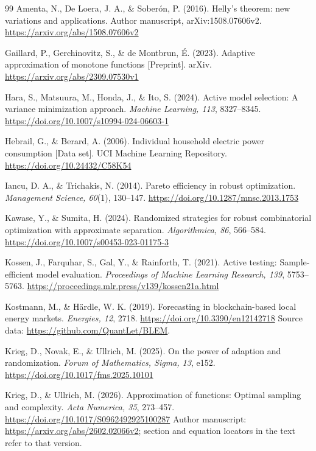 \documentclass[12pt]{article}
\begin{document}
\FloatBarrier
\begin{thebibliography}{99}
Amenta, N., De Loera, J. A., \& Sober\'on, P. (2016). Helly's theorem: new variations
and applications. Author manuscript, arXiv:1508.07606v2.
\url{https://arxiv.org/abs/1508.07606v2}

Gaillard, P., Gerchinovitz, S., \& de Montbrun, {\'E}. (2023).
Adaptive approximation of monotone functions [Preprint].
arXiv. \url{https://arxiv.org/abs/2309.07530v1}

Hara, S., Matsuura, M., Honda, J., \& Ito, S. (2024).
Active model selection: A variance minimization approach.
\emph{Machine Learning, 113}, 8327--8345.
\url{https://doi.org/10.1007/s10994-024-06603-1}

Hebrail, G., \& Berard, A. (2006). Individual household electric power
consumption [Data set]. UCI Machine Learning Repository.
\url{https://doi.org/10.24432/C58K54}

Iancu, D. A., \& Trichakis, N. (2014). Pareto efficiency in robust optimization.
\emph{Management Science, 60}(1), 130--147.
\url{https://doi.org/10.1287/mnsc.2013.1753}

Kawase, Y., \& Sumita, H. (2024). Randomized strategies for robust
combinatorial optimization with approximate separation.
\emph{Algorithmica, 86}, 566--584.
\url{https://doi.org/10.1007/s00453-023-01175-3}

Kossen, J., Farquhar, S., Gal, Y., \& Rainforth, T. (2021).
Active testing: Sample-efficient model evaluation.
\emph{Proceedings of Machine Learning Research, 139}, 5753--5763.
\url{https://proceedings.mlr.press/v139/kossen21a.html}

Kostmann, M., \& H\"ardle, W. K. (2019). Forecasting in blockchain-based
local energy markets. \emph{Energies, 12}, 2718.
\url{https://doi.org/10.3390/en12142718}
Source data: \url{https://github.com/QuantLet/BLEM}.

Krieg, D., Novak, E., \& Ullrich, M. (2025).
On the power of adaption and randomization.
\emph{Forum of Mathematics, Sigma, 13}, e152.
\url{https://doi.org/10.1017/fms.2025.10101}

Krieg, D., \& Ullrich, M. (2026).
Approximation of functions: Optimal sampling and complexity.
\emph{Acta Numerica, 35}, 273--457.
\url{https://doi.org/10.1017/S0962492925100287}
Author manuscript: \url{https://arxiv.org/abs/2602.02066v2};
section and equation locators in the text refer to that version.


\end{thebibliography}
\end{document}
